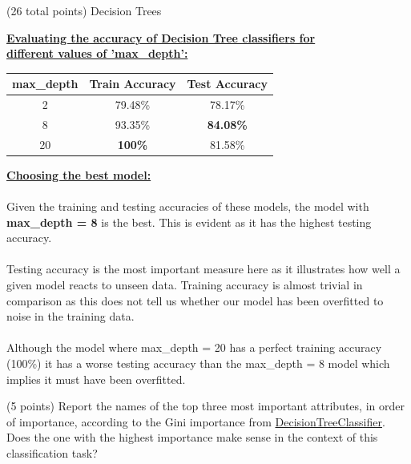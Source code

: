 \documentclass[12pt]{article}
\begin{document}
\begin{question}{(26 total points) Decision Trees}
\begin{subquestion}
\begin{answerbox}{28em}
\large{\textbf{\underline{Evaluating the accuracy of Decision Tree classifiers for}}}\\
\large{\textbf{\underline{different values of 'max\_depth':}}}\\
\normalsize{
\begin{center}
\begin{tabular}{ |c|c|c| }
\hline
\textbf{max\_depth} & \textbf{Train Accuracy} & \textbf{Test Accuracy} \\ \hline
2 & 79.48\% & 78.17\% \\
8 & 93.35\% & \textbf{\textcolor{OliveGreen}{84.08\%}} \\
20 & \textbf{\textcolor{OliveGreen}{100\%}} & 81.58\% \\
\hline
\end{tabular}
\end{center}
}

\normalsize{\textbf{\underline{Choosing the best model:}}\\
\\
Given the training and testing accuracies of these models, the model with \textbf{max\_depth = 8} is the best. This is evident as it has the highest testing accuracy.\\
\\
Testing accuracy is the most important measure here as it illustrates how well a given model reacts to unseen data. Training accuracy is almost trivial in comparison as this does not tell us whether our model has been overfitted to noise in the training data.\\
\\
Although the model where max\_depth = 20 has a perfect training accuracy (100\%) it has a worse testing accuracy than the max\_depth = 8 model which implies it must have been overfitted.
}
\end{answerbox}



\end{subquestion}


%
%
\begin{subquestion}{(5 points) 
Report the names of the top three most important attributes, in order of importance, according to the Gini importance from \href{https://scikit-learn.org/0.19/modules/generated/sklearn.tree.DecisionTreeClassifier.html}{DecisionTreeClassifier}. 
Does the one with the highest importance make sense in the context of this classification task? \\
}



\end{subquestion}
\end{question}
\end{document}
